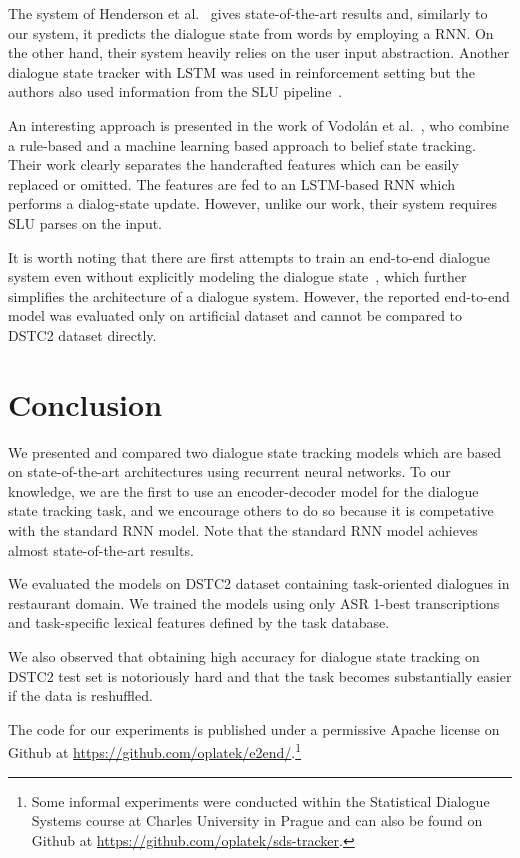 \documentclass{itatnew}
\begin{document}
The system of Henderson et al.~\cite{henderson2014word} gives state-of-the-art results and, similarly to our system, it predicts the dialogue state from words by employing a RNN.
On the other hand, their system heavily relies on the user input abstraction.
Another dialogue state tracker with LSTM was used in reinforcement setting but the authors also used information from the SLU pipeline~\cite{lee2016dialog}.

An interesting approach is presented in the work of Vodolán et al.~\cite{vodolan2015hybrid}, who combine a rule-based and a machine learning based approach to belief state tracking.
Their work clearly separates the handcrafted features which can be easily replaced or omitted.
The features are fed to an LSTM-based RNN which performs a dialog-state update.
However, unlike our work, their system requires SLU parses on the input.

It is worth noting that there are first attempts to train an end-to-end dialogue system even without explicitly modeling the dialogue state~\cite{bordes2016learning}, which further simplifies the architecture of a dialogue system.
However, the reported end-to-end model was evaluated only on artificial dataset and cannot be compared to DSTC2 dataset directly.

\section{Conclusion}
\label{sec:conc}

We presented and compared two dialogue state tracking models which are based on state-of-the-art architectures using recurrent neural networks.
To our knowledge, we are the first to use an encoder-decoder model for the dialogue state tracking task, and we encourage others to do so because it is competative with the standard RNN model. 
Note that the standard RNN model achieves almost state-of-the-art results.

We evaluated the models on DSTC2 dataset containing task-oriented dialogues in restaurant domain. 
We trained the models using only ASR 1-best transcriptions and task-specific lexical features defined by the task database.

We also observed that obtaining high accuracy for dialogue state tracking on DSTC2 test set is notoriously hard and that the task becomes substantially easier if the data is reshuffled.

The code for our experiments is published under a permissive Apache license on Github at \url{https://github.com/oplatek/e2end/}.\footnote{Some informal experiments were conducted  within the Statistical Dialogue Systems course at Charles University in Prague and can also be  found on Github at \url{https://github.com/oplatek/sds-tracker}.}
\end{document}
